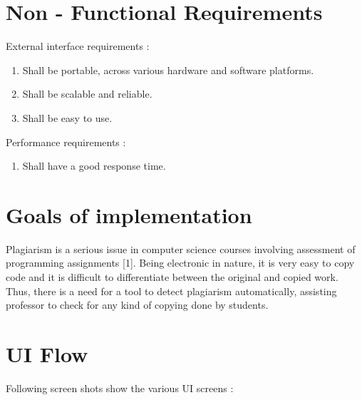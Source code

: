 \documentclass[11pt]{article}
\begin{document}
\section{ Non - Functional Requirements}

External interface requirements : 

 \begin{enumerate}
 \item Shall be portable, across various hardware and software platforms.
\item Shall be scalable and reliable.
\item Shall be easy to use.
      
 \end{enumerate}

Performance requirements :

 \begin{enumerate}

\item Shall have a good response time.
 
  \end{enumerate}
  
\section{Goals of implementation}

Plagiarism is a serious issue in computer
science courses involving assessment of programming
assignments [1]. Being electronic in nature, it is very easy to copy code and it is difficult to differentiate between the original and copied work. Thus, there is a need for a tool to detect plagiarism 
automatically, assisting professor to check for any kind of copying done by students.

\section {UI Flow}

Following screen shots show the various UI screens :
\end{document}
